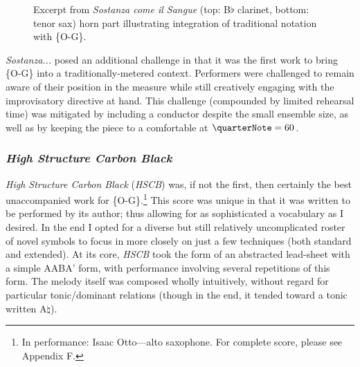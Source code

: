         \begin{figure}
            \centering
            \captionsetup{width=.5\textwidth}
            \caption{Excerpt from \textit{Sostanza come il Sangue} (top: B$\flat$ clarinet, bottom: tenor sax) horn part illustrating integration of traditional notation with \{O-G\}.}
            \label{fig:sostanzahorns}
        \end{figure}

    \textit{Sostanza...} posed an additional challenge in that it was the first work to bring \{O-G\} into a traditionally-metered context. Performers were challenged to remain aware of their position in the measure while still creatively engaging with the improvisatory directive at hand. This challenge (compounded by limited rehearsal time) was mitigated by including a conductor despite the small ensemble size, as well as by keeping the piece to a comfortable  at $\quarterNote=60$.
    
    \subsubsection{\textit{High Structure Carbon Black}} 

    \textit{High Structure Carbon Black} (\textit{HSCB}) was, if not the first, then certainly the best unaccompanied work for \{O-G\}.\footnote{In performance: Isaac Otto---alto saxophone. For complete score, please see Appendix F.} This score was unique in that it was written to be performed by its author; thus allowing for as sophisticated a vocabulary as I desired. In the end I opted for a diverse but still relatively uncomplicated roster of novel symbols to focus in more closely on just a few techniques (both standard and extended). At its core, \textit{HSCB} took the form of an abstracted lead-sheet with a simple AABA' form, with performance involving several repetitions of this form. The melody itself was composed wholly intuitively, without regard for particular tonic/dominant relations (though in the end, it tended toward a tonic written A$\natural$).

